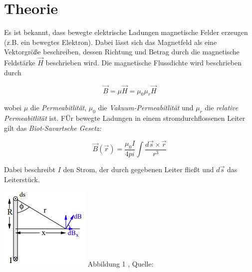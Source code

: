 \section{Theorie}
\label{sec:Theorie}

Es ist bekannt, dass bewegte elektrische Ladungen magnetische Felder erzeugen (z.B. ein bewegtes Elektron).
Dabei lässt sich das Magnetfeld als eine Vektorgröße beschreiben, dessen Richtung und Betrag durch die magnetische Feldstärke $\vec{H}$ beschrieben wird.
Die magnetische Flussdichte wird beschrieben durch

\begin{equation} \label{eq:Flussdichte}
    \vec{B} = \mu \vec{H} = \mu_{0} \mu_{r} \vec{H}
\end{equation}

wobei $\mu$ die \textit{Permeabitlität}, $\mu_{0}$ die \textit{Vakuum-Permeabitlität} und $\mu_{r}$ die \textit{relative Permeabitlität} ist.
FÜr bewegte Ladungen in einem stromdurchflossenen Leiter gilt das \textit{Biot-Savartsche Gesetz:}

\begin{equation} \label{eq:Biot-Savart-Gesetz}
    \vec{B}(\vec{r}) = \frac{\mu_{0}I}{4pi} \int \frac{d\vec{s} \times \vec{r}}{r^3}
\end{equation}


\begin{minipage}{0.7\textwidth}
    Dabei beschreibt $I$ den Strom, der durch gegebenen Leiter fließt und $d\vec{s}$ das Leiterstück.
\end{minipage}
\begin{minipage}{0.3\textwidth}
    \includegraphics[width=\textwidth]{pictures/BiotSavart1.png}
    \small{Abbildung 1 , Quelle: \cite{sample}}
\end{minipage}

